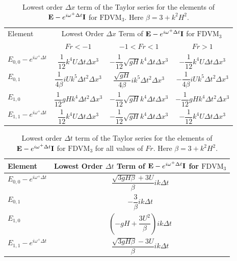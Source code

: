 \begin{table}
	\centering
	\begin{tabular}{l c c c}
		\hline
		Element & \multicolumn{3}{c}{Lowest Order $\Delta x$ Term of $\mathbf{E} - e^{i \omega^+ \Delta t} \mathbf{I}$ for $\text{FDVM}_3$} \T \B \\
		\cline{2-4} 
		& $Fr < -1$& $-1 < Fr < 1$ & $Fr > 1$ \T \B \\
		\hline
		$E_{0,0} -  e^{i \omega^+ \Delta t} $& $\dfrac{1}{12} k^4 U \Delta t \Delta x^3$& $ - \dfrac{1}{12} \sqrt{gH} k^4 \Delta t\Delta x^3$ &$ -\dfrac{1}{12} k^4 U \Delta t \Delta x^3$  \T \B  \\
		$E_{0,1}$& $\dfrac{1}{4 \beta}iUk^5 \Delta t^2 \Delta x^3 $&$ \dfrac{\sqrt{gH}}{4 \beta}i k^5\Delta  t ^2\Delta x^3$ & $-\dfrac{1}{4 \beta}iUk^5 \Delta t^2 \Delta x^3 $  \T \B  \\
		$E_{1,0}$& $\dfrac{1}{12} gHk^4 \Delta t^2 \Delta x^3 $&$ - \dfrac{1}{12} \sqrt{gH} k^4 \Delta t\Delta x^3$ & $-\dfrac{1}{12} gHk^4 \Delta t^2 \Delta x^3 $  \T \B \\
		$E_{1,1} -  e^{i \omega^+ \Delta t}$& $ \dfrac{1}{12} k^4 U \Delta t \Delta x^3$&$ - \dfrac{1}{12} \sqrt{gH} k^4 \Delta t\Delta x^3$ & $ -\dfrac{1}{12} k^4 U \Delta t \Delta x^3$ \T \B  \\ 
		\hline
	\end{tabular}
	\caption{Lowest order $\Delta x$ term of the Taylor series for the elements of $\mathbf{E} - e^{i \omega^+ \Delta t} \mathbf{I}$ for $\text{FDVM}_3$. Here $\beta = 3 + k^2 H^2$.}
	\label{tab:EerrFDVM3dxerror} 
\end{table}
\begin{table}
	\centering
	\begin{tabular}{l  c}
		\hline
		Element & \multicolumn{1}{c}{Lowest Order $\Delta t$ Term of $\mathbf{E} - e^{i \omega^+ \Delta t} \mathbf{I}$ for $\text{FDVM}_3$} \T \B \\
		\hline  
		$E_{0,0} -  e^{i \omega^+ \Delta t} $ & $\dfrac{\sqrt{3gH \beta} + 3U}{\beta} ik \Delta t$ \T \B  \\
		$E_{0,1}$&$ - \dfrac{3}{\beta} ik\Delta t$ \T \B   \\
		$E_{1,0}$& $ \left(-gH + \dfrac{3U^2}{\beta}\right)ik \Delta t$ \T \B  \\
		$E_{1,1} -  e^{i \omega^+ \Delta t}$& $\dfrac{\sqrt{3gH \beta} - 3U}{\beta} ik \Delta t$ \T \B \\ 
		\hline
	\end{tabular}
	\caption{Lowest order $\Delta t$ term of the Taylor series for the elements of $\mathbf{E} - e^{i \omega^+ \Delta t} \mathbf{I}$ for $\text{FDVM}_3$ for all values of $Fr$. Here $\beta = 3 + k^2 H^2$.}
	\label{tab:EerrFDVM3dterror} 
\end{table}

